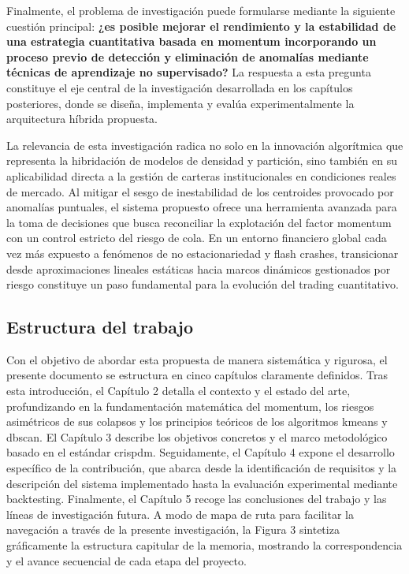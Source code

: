 \documentclass[
]{article}
\begin{document}
	Finalmente, el problema de investigación puede formularse mediante la siguiente cuestión principal: \textbf{¿es posible mejorar el rendimiento y la estabilidad de una estrategia cuantitativa basada en \gls{momentum} incorporando un proceso previo de detección y eliminación de anomalías mediante técnicas de aprendizaje no supervisado?} La respuesta a esta pregunta constituye el eje central de la investigación desarrollada en los capítulos posteriores, donde se diseña, implementa y evalúa experimentalmente la arquitectura híbrida propuesta.
	
	La relevancia de esta investigación radica no solo en la innovación algorítmica que representa la hibridación de modelos de densidad y partición, sino también en su aplicabilidad directa a la gestión de carteras institucionales en condiciones reales de mercado. Al mitigar el sesgo de inestabilidad de los centroides provocado por anomalías puntuales, el sistema propuesto ofrece una herramienta avanzada para la toma de decisiones que busca reconciliar la explotación del factor \gls{momentum} con un control estricto del riesgo de cola. En un entorno financiero global cada vez más expuesto a fenómenos de no estacionariedad y flash crashes, transicionar desde aproximaciones lineales estáticas hacia marcos dinámicos gestionados por riesgo constituye un paso fundamental para la evolución del \gls{trading} cuantitativo.
	
	\subsection{Estructura del trabajo}\label{estructura-del-trabajo}
	
	Con el objetivo de abordar esta propuesta de manera sistemática y rigurosa, el presente documento se estructura en cinco capítulos claramente definidos. Tras esta introducción, el Capítulo 2 detalla el contexto y el estado del arte, profundizando en la fundamentación matemática del \gls{momentum}, los riesgos asimétricos de sus colapsos y los principios teóricos de los algoritmos \gls{kmeans} y \gls{dbscan}. El Capítulo 3 describe los objetivos concretos y el marco metodológico basado en el estándar \gls{crispdm}. Seguidamente, el Capítulo 4 expone el desarrollo específico de la contribución, que abarca desde la identificación de requisitos y la descripción del sistema implementado hasta la evaluación experimental mediante backtesting. Finalmente, el Capítulo 5 recoge las conclusiones del trabajo y las líneas de investigación futura. A modo de mapa de ruta para facilitar la navegación a través de la presente investigación, la Figura 3 sintetiza gráficamente la estructura capitular de la memoria, mostrando la correspondencia y el avance secuencial de cada etapa del proyecto.	
	
\end{document}
